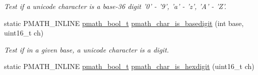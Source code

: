 \begin{CompactItemize}
\begin{CompactList}\small\item\em Test if a unicode character is a base-36 digit '0' - '9', 'a' - 'z', 'A' - 'Z'. \item\end{CompactList}\item 
\hypertarget{group__parser_g32d9be93e7500f18969a66a581274d6a}{
static PMATH\_\-INLINE \hyperlink{group__general__types_gc92090cb0b56345d6c379ed2341d4ef4}{pmath\_\-bool\_\-t} \hyperlink{group__parser_g32d9be93e7500f18969a66a581274d6a}{pmath\_\-char\_\-is\_\-basedigit} (int base, uint16\_\-t ch)}
\label{group__parser_g32d9be93e7500f18969a66a581274d6a}

\begin{CompactList}\small\item\em Test if in a given base, a unicode character is a digit. \item\end{CompactList}\item 
\hypertarget{group__parser_g5e8ff2e909383f7d10d73887bf616ba3}{
static PMATH\_\-INLINE \hyperlink{group__general__types_gc92090cb0b56345d6c379ed2341d4ef4}{pmath\_\-bool\_\-t} \hyperlink{group__parser_g5e8ff2e909383f7d10d73887bf616ba3}{pmath\_\-char\_\-is\_\-hexdigit} (uint16\_\-t ch)}
\label{group__parser_g5e8ff2e909383f7d10d73887bf616ba3}


\end{CompactItemize}
